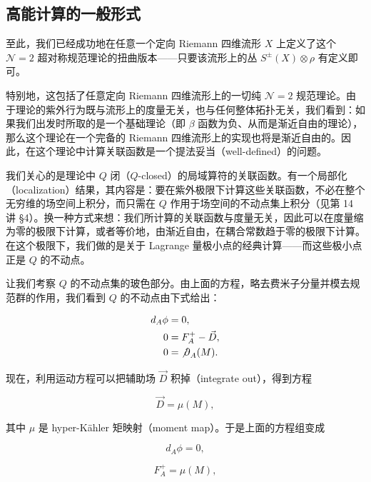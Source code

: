 \subsection{高能计算的一般形式}

至此，我们已经成功地在任意一个定向 Riemann 四维流形 $X$ 上定义了这个 $\mathcal{N}=2$ 超对称规范理论的扭曲版本——只要该流形上的丛 $S^\pm(X)\otimes\rho$ 有定义即可。


特别地，这包括了任意定向 Riemann 四维流形上的一切纯 $\mathcal{N}=2$ 规范理论。由于理论的紫外行为既与流形上的度量无关，也与任何整体拓扑无关，我们看到：如果我们出发时所取的是一个基础理论（即 $\beta$ 函数为负、从而是渐近自由的理论），那么这个理论在一个完备的 Riemann 四维流形上的实现也将是渐近自由的。因此，在这个理论中计算关联函数是一个提法妥当（well-defined）的问题。

我们关心的是理论中 $Q$ 闭（$Q$-closed）的局域算符的关联函数。有一个局部化（localization）结果，其内容是：要在紫外极限下计算这些关联函数，不必在整个无穷维的场空间上积分，而只需在 $Q$ 作用于场空间的不动点集上积分（见第 14 讲 §4）。换一种方式来想：我们所计算的关联函数与度量无关，因此可以在度量缩为零的极限下计算，或者等价地，由渐近自由，在耦合常数趋于零的极限下计算。在这个极限下，我们做的是关于 Lagrange 量极小点的经典计算——而这些极小点正是 $Q$ 的不动点。

让我们考察 $Q$ 的不动点集的玻色部分。由上面的方程，略去费米子分量并模去规范群的作用，我们看到 $Q$ 的不动点由下式给出：

\[
\begin{aligned}
  d_A\phi&=0,\\
  0&=F_A^+-\vec D,\\
  0&={\not\partial}_A(M).
\end{aligned}
\]

现在，利用运动方程可以把辅助场 $\vec D$ 积掉（integrate out），得到方程

\[
  \vec D=\mu(M),
\]

其中 $\mu$ 是 hyper-Kähler 矩映射（moment map）。于是上面的方程组变成

\begin{equation}
  \tag{19.2}
  \label{eq:19-2}
  d_A\phi=0,
\end{equation}

\begin{equation}
  \tag{19.3}
  \label{eq:19-3}
  F_A^+=\mu(M),
\end{equation}

